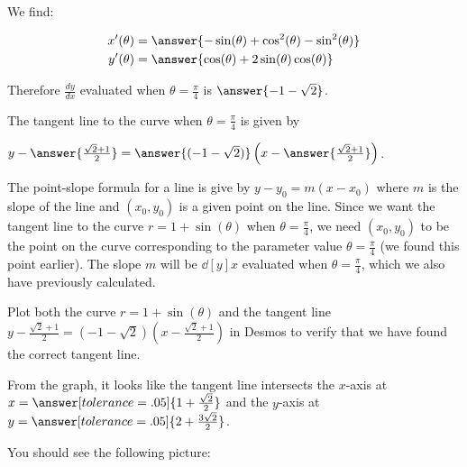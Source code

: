 \documentclass{ximera}
\begin{document}
\begin{exercise}
\begin{exercise}
\begin{hint}
We find:

\begin{align*}
x'(\theta)&=\answer{ -\sin(\theta)+\cos^2(\theta)-\sin^2(\theta)} \\
y'(\theta)&=\answer{ \cos(\theta)+2\sin(\theta)\cos(\theta) }
\end{align*} 

Therefore $\frac{dy}{dx}$ evaluated when $\theta=\frac{\pi}{4}$ is $\answer{ -1-\sqrt{2}   }$.


\end{hint}

\begin{exercise}

The tangent line to the curve when $\theta=\frac{\pi}{4}$ is given by 

$y-\answer{\frac{\sqrt{2}+1}{2}   }=\answer{ ( -1-\sqrt{2} )  }\left( x- \answer{  \frac{\sqrt{2}+1}{2} }  \right)$. 

\begin{hint}


The point-slope formula for a line is give by $y-y_{0}=m(x-x_{0})$ where $m$ is the slope of the line and $(x_{0},y_{0})$ is a given point on the line. 
Since we want the tangent line to the curve $r=1+\sin(\theta)$ when $\theta=\frac{\pi}{4}$, we need $(x_{0},y_{0})$ to be the point on the curve corresponding to the parameter value $\theta=\frac{\pi}{4}$ (we found this point earlier). The slope $m$ will be $\dd[y]{x}$ evaluated when $\theta=\frac{\pi}{4}$, which we also have previously calculated. 

\end{hint}

\begin{exercise}
Plot both the curve $r= 1 + \sin(\theta)$ and the tangent line $y-\frac{\sqrt{2}+1}{2}   = ( -1-\sqrt{2} )  \left( x-  \frac{\sqrt{2}+1}{2}   \right)$ in Desmos to verify that we have found the correct tangent line.  

From the graph, it looks like the tangent line intersects the $x$-axis at $x=\answer[tolerance=.05]{ 1+ \frac{\sqrt{2}}{2} }$ and the $y$-axis at $y=\answer[tolerance=.05]{2+\frac{3\sqrt{2}}{2}}$.

\begin{hint}
You should see the following picture:


\end{hint}
\end{exercise}
\end{exercise}
\end{exercise}
\end{exercise}
\end{document}
